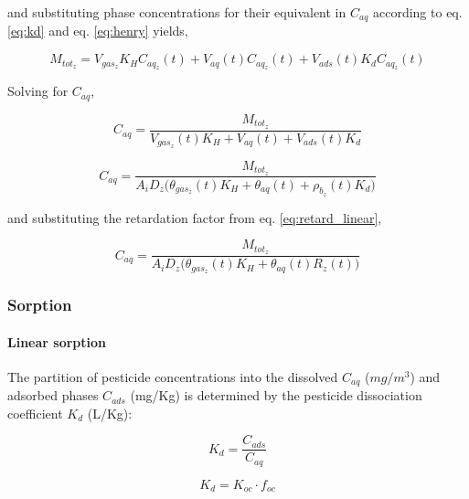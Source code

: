 \documentclass[]{article}
\let\oldparagraph\paragraph
\renewcommand{\paragraph}[1]{\oldparagraph{#1}\mbox{}}
\begin{document}
and substituting phase concentrations for their equivalent in \(C_{aq}\)
according to eq. \ref{eq:kd} and eq. \ref{eq:henry} yields,

\begin{equation}
M_{tot_z} = V_{gas_z}K_H C_{aq_z}(t) + V_{aq}(t)C_{aq_z}(t) + V_{ads}(t)K_dC_{aq_z}(t)
\label{eq:mass_tot_sub}  
\end{equation}

Solving for \(C_{aq}\),

\begin{equation}
C_{aq} = \frac{M_{tot_z} }{  V_{gas_z}(t)K_H + V_{aq}(t) + V_{ads}(t)K_d }
\label{eq:mass_tot_conc_aq1}  
\end{equation}

\begin{equation}
C_{aq} = \frac{M_{tot_z} }{ A_iD_z \Big( \theta_{gas_z}(t)K_H + \theta_{aq}(t) + \rho_{b_z}(t)K_d \Big)}
\label{eq:mass_tot_conc_aq2}  
\end{equation}

and substituting the retardation factor from eq. \ref{eq:retard_linear},

\begin{equation}
C_{aq} = \frac{M_{tot_z} }{ A_iD_z \Big( \theta_{gas_z}(t)K_H + \theta_{aq}(t)R_z(t) \Big)}
\label{eq:mass_tot_conc_aq2}  
\end{equation}

\hypertarget{sorption}{%
\subsubsection{Sorption}\label{sorption}}

\hypertarget{linear-sorption}{%
\paragraph{Linear sorption}\label{linear-sorption}}

The partition of pesticide concentrations into the dissolved \(C_{aq}\)
(\(mg/m^3\)) and adsorbed phases \(C_{ads}\) (mg/Kg) is determined by
the pesticide dissociation coefficient \(K_d\) (L/Kg):

\begin{equation}
K_d = \frac{ C_{ads} }{ C_{aq}  }
\label{eq:kd}
\end{equation}

\begin{equation}
K_d = K_{oc} \cdot f_{oc}
\label{eq:kd}
\end{equation}
\end{document}
